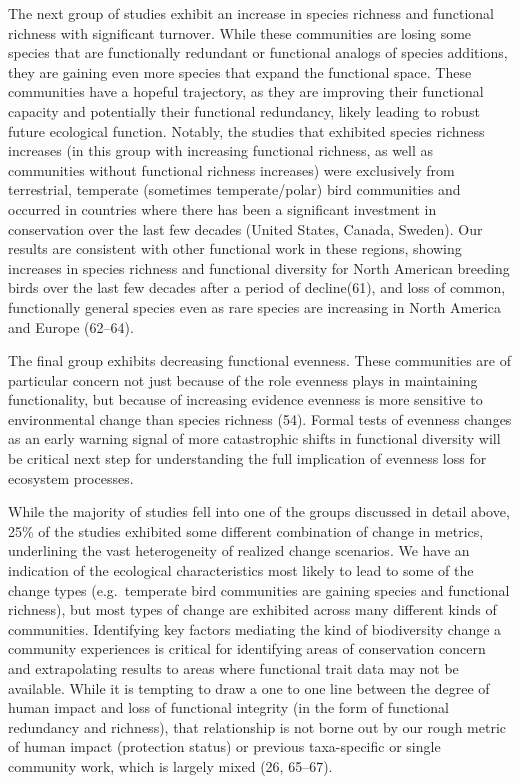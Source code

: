 \documentclass{article}
\begin{document}
The next group of studies exhibit an increase in species richness and
functional richness with significant turnover. While these communities
are losing some species that are functionally redundant or functional
analogs of species additions, they are gaining even more species that
expand the functional space. These communities have a hopeful
trajectory, as they are improving their functional capacity and
potentially their functional redundancy, likely leading to robust future
ecological function. Notably, the studies that exhibited species
richness increases (in this group with increasing functional richness,
as well as communities without functional richness increases) were
exclusively from terrestrial, temperate (sometimes temperate/polar) bird
communities and occurred in countries where there has been a significant
investment in conservation over the last few decades (United States,
Canada, Sweden). Our results are consistent with other functional work
in these regions, showing increases in species richness and functional
diversity for North American breeding birds over the last few decades
after a period of decline(61), and loss of common, functionally general
species even as rare species are increasing in North America and Europe
(62--64).

The final group exhibits decreasing functional evenness. These
communities are of particular concern not just because of the role
evenness plays in maintaining functionality, but because of increasing
evidence evenness is more sensitive to environmental change than species
richness (54). Formal tests of evenness changes as an early warning
signal of more catastrophic shifts in functional diversity will be
critical next step for understanding the full implication of evenness
loss for ecosystem processes.

While the majority of studies fell into one of the groups discussed in
detail above, 25\% of the studies exhibited some different combination
of change in metrics, underlining the vast heterogeneity of realized
change scenarios. We have an indication of the ecological
characteristics most likely to lead to some of the change types
(e.g.~temperate bird communities are gaining species and functional
richness), but most types of change are exhibited across many different
kinds of communities. Identifying key factors mediating the kind of
biodiversity change a community experiences is critical for identifying
areas of conservation concern and extrapolating results to areas where
functional trait data may not be available. While it is tempting to draw
a one to one line between the degree of human impact and loss of
functional integrity (in the form of functional redundancy and
richness), that relationship is not borne out by our rough metric of
human impact (protection status) or previous taxa-specific or single
community work, which is largely mixed (26, 65--67).
\end{document}
